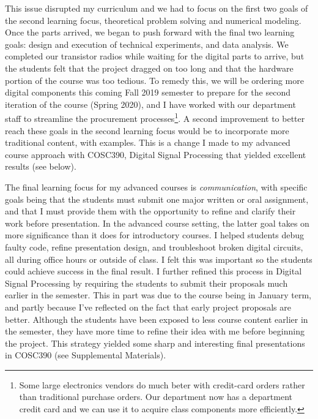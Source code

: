 \documentclass[../../../main.tex]{subfiles}
\begin{document}
This issue disrupted my curriculum and we had to focus on the first two goals of the second learning focus, theoretical problem solving and numerical modeling.  Once the parts arrived, we began to push forward with the final two learning goals: design and execution of technical experiments, and data analysis.  We completed our transistor radios while waiting for the digital parts to arrive, but the students felt that the project dragged on too long and that the hardware portion of the course was too tedious.  To remedy this, we will be ordering more digital components this coming Fall 2019 semester to prepare for the second iteration of the course (Spring 2020), and I have worked with our department staff to streamline the procurement processes\footnote{Some large electronics vendors do much beter with credit-card orders rather than traditional purchase orders.  Our department now has a department credit card and we can use it to acquire class components more efficiently.}.  A second improvement to better reach these goals in the second learning focus would be to incorporate more traditional content, with examples.  This is a change I made to my advanced course approach with COSC390, Digital Signal Processing that yielded excellent results (see below).\\ \hspace{0.1cm}

The final learning focus for my advanced courses is \textit{communication}, with specific goals being that the students must submit one major written or oral assignment, and that I must provide them with the opportunity to refine and clarify their work before presentation.  In the advanced course setting, the latter goal takes on more significance than it does for introductory courses.  I helped students debug faulty code, refine presentation design, and troubleshoot broken digital circuits, all during office hours or outside of class.  I felt this was important so the students could achieve success in the final result.  I further refined this process in Digital Signal Processing by requiring the students to submit their proposals much earlier in the semester.  This in part was due to the course being in January term, and partly because I've reflected on the fact that early project proposals are better.  Although the students have been exposed to less course content earlier in the semester, they have more time to refine their idea with me before beginning the project.  This strategy yielded some sharp and interesting final presentations in COSC390 (see Supplemental Materials).  \\ \hspace{0.1cm}
\end{document}
